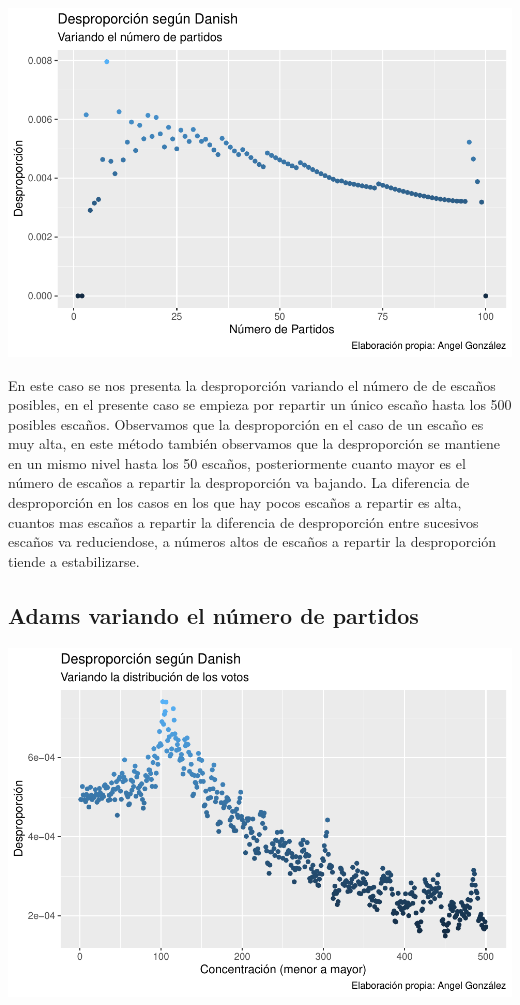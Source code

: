 \documentclass[12pt,a4paper,]{book}
\numberwithin{dummy}{section}
\theoremstyle{ocrenumbox}
\theoremstyle{blacknumex}
\theoremstyle{blacknumbox}
\theoremstyle{ocrenum}
\theoremstyle{ocrenum}
\begin{document}
\begin{center}\includegraphics[width=0.95\linewidth]{figurasR/unnamed-chunk-37-1} \end{center}

En este caso se nos presenta la desproporción variando el número de de
escaños posibles, en el presente caso se empieza por repartir un único
escaño hasta los 500 posibles escaños. Observamos que la desproporción
en el caso de un escaño es muy alta, en este método también observamos
que la desproporción se mantiene en un mismo nivel hasta los 50 escaños,
posteriormente cuanto mayor es el número de escaños a repartir la
desproporción va bajando. La diferencia de desproporción en los casos en
los que hay pocos escaños a repartir es alta, cuantos mas escaños a
repartir la diferencia de desproporción entre sucesivos escaños va
reduciendose, a números altos de escaños a repartir la desproporción
tiende a estabilizarse.

\hypertarget{adams-variando-el-nuxfamero-de-partidos}{%
\subsection{Adams variando el número de
partidos}\label{adams-variando-el-nuxfamero-de-partidos}}

\begin{center}\includegraphics[width=0.95\linewidth]{figurasR/unnamed-chunk-38-1} \end{center}
\end{document}
